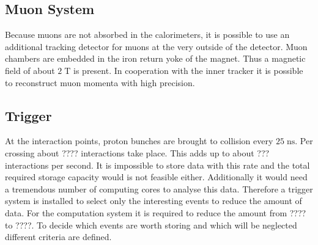 \subsection{Muon System}
\label{sec:muonsystem}
	Because muons are not absorbed in the calorimeters, it is possible to use an additional tracking detector for muons at the very outside of the detector. Muon chambers are embedded in the iron return yoke of the magnet. Thus a magnetic field of about $2\;\text{T}$ is present.
	In cooperation with the inner tracker it is possible to reconstruct muon momenta with high precision.
\subsection{Trigger}
\label{sec:trigger}
	At the interaction points, proton bunches are brought to collision every $25\;\text{ns}$. Per crossing about ????
	interactions take place. This adds up to about ???
	interactions per second. It is impossible to store data with this rate and the total required storage capacity would is not feasible either. Additionally it would need a tremendous number of computing cores to analyse this data. Therefore a trigger system is installed to select only the interesting events to reduce the amount of data. For the computation system it is required to reduce the amount from ???? to ????.
 	To decide which events are worth storing and which will be neglected different criteria are defined.
	
	